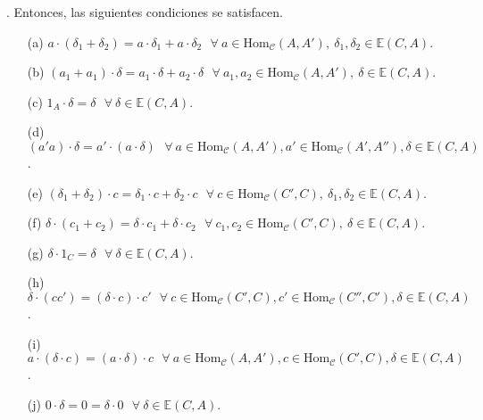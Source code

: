 \documentclass[preview]{standalone}
\begin{document}
\begin{center}
. Entonces, las siguientes condiciones se satisfacen. \begin{enumerate} \item[(a)] $a\cdot(\delta_1+\delta_2) = a\cdot\delta_1 + a\cdot\delta_2 \ \ \ \forall \ a\in\text{Hom}_\mathscr{C}(A,A'), \ \delta_1,\delta_2\in\mathbb{E}(C,A)$. \item[(b)] $(a_1+a_1)\cdot\delta = a_1\cdot\delta + a_2\cdot\delta \ \ \ \forall \ a_1,a_2\in\text{Hom}_\mathscr{C}(A,A'), \ \delta\in\mathbb{E}(C,A)$. \item[(c)] $1_A\cdot\delta = \delta \ \ \ \forall \ \delta\in\mathbb{E}(C,A)$. \item[(d)] $(a'a)\cdot\delta = a'\cdot(a\cdot\delta) \ \ \ \forall \ a\in\text{Hom}_\mathscr{C}(A,A'), a'\in\text{Hom}_\mathscr{C}(A',A''), \delta\in\mathbb{E}(C,A)$. \item[(e)] $(\delta_1+\delta_2)\cdot c = \delta_1\cdot c + \delta_2\cdot c \ \ \ \forall \ c\in\text{Hom}_\mathscr{C}(C',C), \ \delta_1,\delta_2\in\mathbb{E}(C,A)$. \item[(f)] $\delta\cdot(c_1+c_2)=\delta\cdot c_1 + \delta\cdot c_2 \ \ \ \forall \ c_1,c_2\in\text{Hom}_\mathscr{C}(C',C), \ \delta\in\mathbb{E}(C,A)$. \item[(g)] $\delta\cdot1_C  = \delta \ \ \ \forall \ \delta\in\mathbb{E}(C,A)$. \item[(h)] $\delta\cdot(cc') = (\delta\cdot c)\cdot c' \ \ \ \forall \ c\in\text{Hom}_\mathscr{C}(C',C), c'\in\text{Hom}_\mathscr{C}(C'',C'), \delta\in\mathbb{E}(C,A)$. \item[(i)] $a\cdot(\delta\cdot c) = (a\cdot\delta)\cdot c \ \ \ \forall \ a\in\text{Hom}_\mathscr{C}(A,A'), c\in\text{Hom}_\mathscr{C}(C',C), \delta\in\mathbb{E}(C,A)$. \item[(j)] $0\cdot\delta = 0 = \delta\cdot0 \ \ \ \forall \ \delta\in\mathbb{E}(C,A)$. \end{enumerate}
\end{center}
\end{document}
